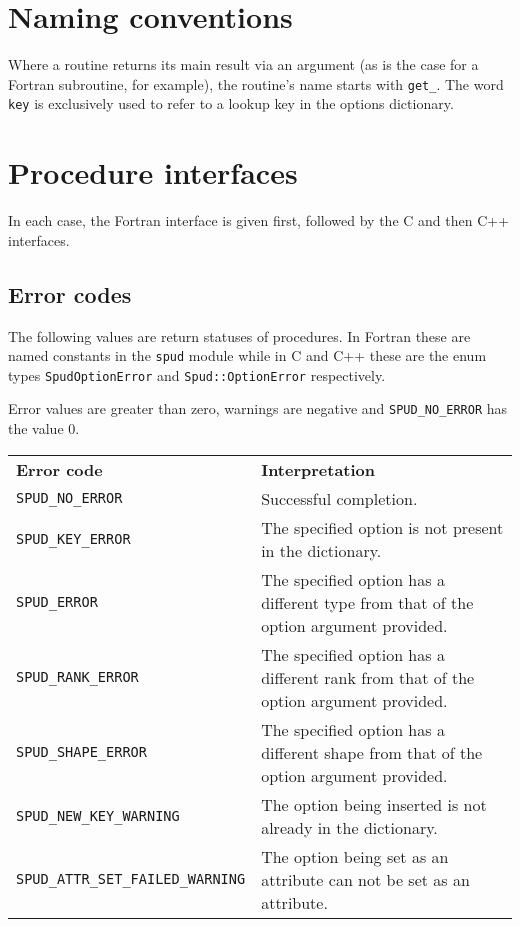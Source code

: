 \documentclass[a4paper, 11pt]{book}
\begin{document}
\section{Naming conventions}

Where a routine returns its main result via an argument (as is the case for
a Fortran subroutine, for example), the routine's name starts with
\lstinline[language=fortran]+get_+. The word
\lstinline[language=fortran]+key+ is exclusively used to refer to a lookup key in
the options dictionary.

\section{Procedure interfaces}
\lstset{frame=single}

In each case, the Fortran interface is given first, followed by the C and
then C++ interfaces.

\subsection{Error codes}\label{sec:error_codes}

The following values are return statuses of procedures. In Fortran these are
named constants in the \lstinline+spud+ module while in C and C++ these are
the enum types \lstinline+SpudOptionError+ and \lstinline+Spud::OptionError+
respectively.

Error values are greater than zero, warnings are negative and
\lstinline+SPUD_NO_ERROR+ has the value 0.

\begin{tabular}{lp{8cm}}
  \textbf{Error code} & \textbf{Interpretation}\\
  \lstinline+SPUD_NO_ERROR+ & Successful completion.\\
  \lstinline+SPUD_KEY_ERROR+ & The specified option is not present in the
  dictionary.\\
  \lstinline+SPUD_ERROR+ & The specified option has a different type
  from that of the option argument provided.\\
  \lstinline+SPUD_RANK_ERROR+ & The specified option has a different rank
  from that of the option argument provided.\\
  \lstinline+SPUD_SHAPE_ERROR+ & The specified option has a different shape
  from that of the option argument provided.\\
  \lstinline+SPUD_NEW_KEY_WARNING+ & The option being inserted is not
  already in the dictionary.\\
  \lstinline+SPUD_ATTR_SET_FAILED_WARNING+ & The option being set as an
  attribute can not be set as an attribute.
\end{tabular}
\end{document}
